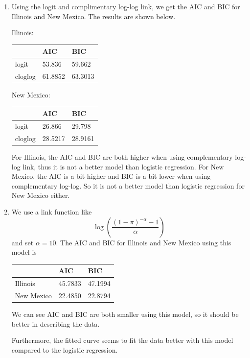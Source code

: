 \documentclass{article}
\begin{document}
\begin{enumerate}[leftmargin = 0 em, label = \arabic*., font = \bfseries]
\begin{enumerate}
	 \item 
	 Using the logit and complimentary log-log link, we get the AIC and BIC for Illinois and New Mexico. The results are shown below.

	 Illinois:

	 \begin{center}
	   	\begin{tabular}{lll}
	   	\toprule
	   	 & AIC & BIC\\
	   	 \midrule
   logit & 53.836 & 59.662\\
   cloglog &  61.8852 & 63.3013\\
   \bottomrule
	   	\end{tabular}
	   \end{center}  

	 New Mexico:
	 \begin{center}
	   	\begin{tabular}{lll}
	   	\toprule
	   	 & AIC & BIC\\
	   	 \midrule
   logit & 26.866 & 29.798\\
   cloglog &  28.5217 & 28.9161\\
   \bottomrule
	   	\end{tabular}
	   \end{center}  
	
	For Illinois, the AIC and BIC are both higher when using complementary log-log link, thus it is not a better model than logistic regression. For New Mexico, the AIC is a bit higher and BIC is a bit lower when using complementary log-log. So it is not a better model than logistic regression for New Mexico either.


	\item 
    We use a link function like
    \[\log\left(\frac{(1 - \pi)^{- \alpha}-1}{\alpha}\right)\]
    and set $\alpha = 10$. 
	The AIC and BIC for Illinois and New Mexico using this model is 
	\begin{center}
		\begin{tabular}{lll}
		 \toprule
		 & AIC & BIC\\
		 \midrule
		 Illinois & 45.7833 & 47.1994\\
		 New Mexico & 22.4850 & 22.8794\\
		 \bottomrule
		\end{tabular}
	\end{center}
	We can see AIC and BIC are both smaller using this model, so it should be better in describing the data. 

	Furthermore, the fitted curve seems to fit the data better with this model compared to the logistic regression.


\end{enumerate}
\end{enumerate}
\end{document}
